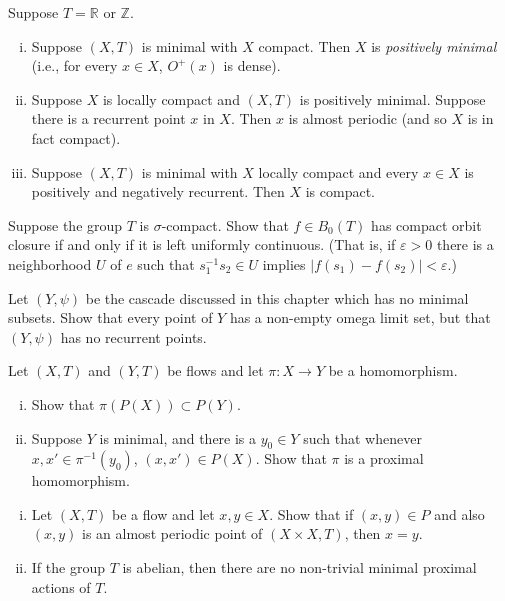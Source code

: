 \begin{exercise*}[11]
    Suppose $T=\mathbb{R}$ or $\mathbb{Z}$.
    \begin{enumerate}[(i)]
        \item Suppose $(X,T)$ is minimal with $X$ compact. Then $X$ is \emph{positively minimal} (i.e., for every $x\in X$, $O^{+}(x)$ is dense).
        \item Suppose $X$ is locally compact and $(X,T)$ is positively minimal. Suppose there is a recurrent point $x$ in $X$. Then $x$ is almost periodic (and so $X$ is in fact compact).
        \item Suppose $(X,T)$ is minimal with $X$ locally compact and every $x\in X$ is positively and negatively recurrent. Then $X$ is compact.
    \end{enumerate}
\end{exercise*}


\begin{exercise*}[12]
    Suppose the group $T$ is $\sigma$-compact. Show that $f \in B_0(T)$ has compact orbit closure if and only if it is left uniformly continuous. (That is, if $\varepsilon>0$ there is a neighborhood $U$ of $e$ such that $s_1^{-1}s_2 \in U$ implies $\lvert f(s_1)-f(s_2)\rvert<\varepsilon$.)
\end{exercise*}



\begin{exercise*}[14]
    Let $(Y,\psi)$ be the cascade discussed in this chapter which has no minimal subsets. Show that every point of $Y$ has a non-empty omega limit set, but that $(Y,\psi)$ has no recurrent points.
\end{exercise*}

\begin{exercise*}[15]
    Let $(X,T)$ and $(Y,T)$ be flows and let $\pi : X \to Y$ be a homomorphism.
    \begin{enumerate}[(i)]
        \item Show that $\pi(P(X)) \subset P(Y)$.
        \item Suppose $Y$ is minimal, and there is a $y_0 \in Y$ such that whenever $x, x' \in \pi^{-1}(y_0)$, $(x, x') \in P(X)$. Show that $\pi$ is a proximal homomorphism.
    \end{enumerate}
\end{exercise*}


\begin{exercise*}[16]
    \begin{enumerate}[(i)]
        \item Let $(X,T)$ be a flow and let $x,y \in X$. Show that if $(x,y) \in P$ and also $(x,y)$ is an almost periodic point of $(X \times X, T)$, then $x = y$.
        \item If the group $T$ is abelian, then there are no non-trivial minimal proximal actions of $T$.
    \end{enumerate}
\end{exercise*}

